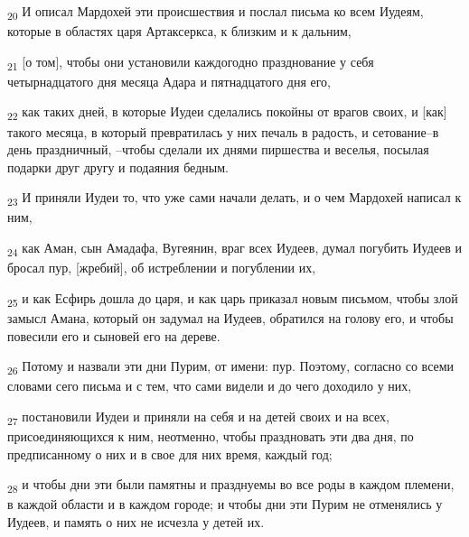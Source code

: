 \begin{tcolorbox}
\textsubscript{20} И описал Мардохей эти происшествия и послал письма ко всем Иудеям, которые в областях царя Артаксеркса, к близким и к дальним,
\end{tcolorbox}
\begin{tcolorbox}
\textsubscript{21} [о том], чтобы они установили каждогодно празднование у себя четырнадцатого дня месяца Адара и пятнадцатого дня его,
\end{tcolorbox}
\begin{tcolorbox}
\textsubscript{22} как таких дней, в которые Иудеи сделались покойны от врагов своих, и [как] такого месяца, в который превратилась у них печаль в радость, и сетование--в день праздничный, --чтобы сделали их днями пиршества и веселья, посылая подарки друг другу и подаяния бедным.
\end{tcolorbox}
\begin{tcolorbox}
\textsubscript{23} И приняли Иудеи то, что уже сами начали делать, и о чем Мардохей написал к ним,
\end{tcolorbox}
\begin{tcolorbox}
\textsubscript{24} как Аман, сын Амадафа, Вугеянин, враг всех Иудеев, думал погубить Иудеев и бросал пур, [жребий], об истреблении и погублении их,
\end{tcolorbox}
\begin{tcolorbox}
\textsubscript{25} и как Есфирь дошла до царя, и как царь приказал новым письмом, чтобы злой замысл Амана, который он задумал на Иудеев, обратился на голову его, и чтобы повесили его и сыновей его на дереве.
\end{tcolorbox}
\begin{tcolorbox}
\textsubscript{26} Потому и назвали эти дни Пурим, от имени: пур. Поэтому, согласно со всеми словами сего письма и с тем, что сами видели и до чего доходило у них,
\end{tcolorbox}
\begin{tcolorbox}
\textsubscript{27} постановили Иудеи и приняли на себя и на детей своих и на всех, присоединяющихся к ним, неотменно, чтобы праздновать эти два дня, по предписанному о них и в свое для них время, каждый год;
\end{tcolorbox}
\begin{tcolorbox}
\textsubscript{28} и чтобы дни эти были памятны и празднуемы во все роды в каждом племени, в каждой области и в каждом городе; и чтобы дни эти Пурим не отменялись у Иудеев, и память о них не исчезла у детей их.
\end{tcolorbox}
